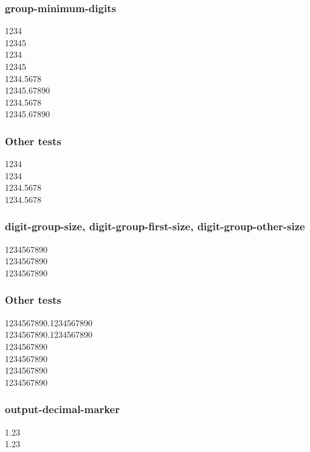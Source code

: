 \documentclass{article}
\begin{document}
\subsubsection{group-minimum-digits}
\num{1234} \\
\num{12345} \\
\num[group-minimum-digits = 5]{1234} \\
\num[group-minimum-digits = 5]{12345} \\
\num{1234.5678} \\
\num{12345.67890} \\
\num[group-minimum-digits = 5]{1234.5678} \\
\num[group-minimum-digits = 5]{12345.67890}

\subsubsection*{Other tests}
\num{1234} \\
\num[group-minimum-digits = 4]{1234} \\
\num{1234.5678} \\
\num[group-minimum-digits = 4]{1234.5678}

\subsubsection{digit-group-size, digit-group-first-size, digit-group-other-size}
\num{1234567890} \\
\num[digit-group-size = 5]{1234567890} \\
\num[digit-group-other-size = 2]{1234567890}

\subsubsection*{Other tests}
\num{1234567890.1234567890}\\
\num[digit-group-size=4]{1234567890.1234567890}\\
\num[digit-group-size = 5, digit-group-other-size = 2]{1234567890} \\
\num[digit-group-other-size = 2, digit-group-size = 5]{1234567890} \\
\num[digit-group-size = 5, digit-group-first-size = 2]{1234567890} \\
\num[digit-group-first-size = 2, digit-group-size = 5]{1234567890}

\subsubsection{output-decimal-marker}
\num{1.23} \\
\num[output-decimal-marker = {,}]{1.23} %
\end{document}
